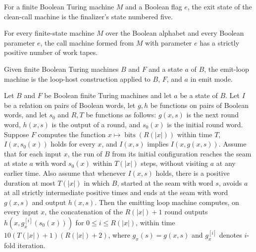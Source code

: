 \begin{definition}
\label{Turing.FinTM.callExit}
\leanok
{}
For a finite Boolean Turing machine $M$ and a Boolean flag $e$, the exit state of the
clean-call machine is the finalizer's state numbered five.
\end{definition}

\begin{theorem}
\label{Turing.FinTM.callTM_k_pos}
\leanok
{}
For every finite-state machine $M$ over the Boolean alphabet and every Boolean parameter
$e$, the call machine formed from $M$ with parameter $e$ has a strictly positive number
of work tapes.
\end{theorem}

\begin{definition}
\label{Turing.FinTM.emitLoopTM}
\leanok
{}
Given finite Boolean Turing machines $B$ and $F$ and a state $a$ of $B$, the emit-loop
machine is the loop-host construction applied to $B$, $F$, and $a$ in emit mode.
\end{definition}

\begin{theorem}
\label{Turing.FinTM.emitLoopTM_computes}
\leanok
{}
Let $B$ and $F$ be Boolean finite Turing machines and let $a$ be a state of $B$. Let $I$
be a relation on pairs of Boolean words, let $g,h$ be functions on pairs of Boolean
words, and let $s_0$ and $R,T$ be functions as follows: $g(x,s)$ is the next round word,
$h(x,s)$ is the output of a round, and $s_0(x)$ is the initial round word. Suppose $F$
computes the function $x\mapsto \operatorname{bits}(R(|x|))$ within time $T$,
$I(x,s_0(x))$ holds for every $x$, and $I(x,s)$ implies $I(x,g(x,s))$. Assume that for
each input $x$, the run of $B$ from its initial configuration reaches the seam at state
$a$ with word $s_0(x)$ within $T(|x|)$ steps, without visiting $a$ at any earlier time.
Also assume that whenever $I(x,s)$ holds, there is a positive duration at most $T(|x|)$
in which $B$, started at the seam with word $s$, avoids $a$ at all strictly intermediate
positive times and ends at the seam with word $g(x,s)$ and output $h(x,s)$. Then the
emitting loop machine computes, on every input $x$, the concatenation of the $R(|x|)+1$
round outputs $h(x,g_x^{[i]}(s_0(x)))$ for $0\le i\le R(|x|)$, within time
$10(T(|x|)+1)(R(|x|)+2)$, where $g_x(s)=g(x,s)$ and $g_x^{[i]}$ denotes $i$-fold
iteration.
\end{theorem}

